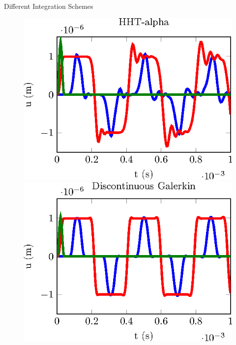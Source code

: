 \documentclass[10pt,a4paper]{beamer}
\begin{document}
\begin{frame}{Different Integration Schemes}
\begin{figure}
\begin{minipage}{0.35\linewidth}
		\end{minipage}
	\end{figure}
	\vspace{-0.4cm}
	\begin{figure}
		\begin{minipage}{0.35\linewidth}
			\includegraphics[width=1\linewidth]{CalculSchem5.T1.tikz.eps}
		\end{minipage}
		 \hspace{1cm}
		\begin{minipage}{0.35\linewidth}
			\includegraphics*[width=1\linewidth]{CalculSchem6.T1.tikz.eps}
		\end{minipage}
	\end{figure}
\end{frame}
\end{document}
